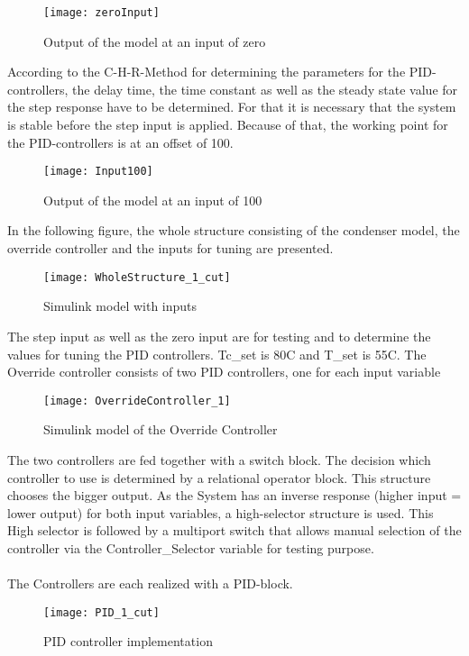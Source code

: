 \begin{figure}[H]
	\centering
	\texttt{[image: zeroInput]}
	\caption{Output of the model at an input of zero}
	\label{fig:zeorInput}
\end{figure}

\newpage



According to the C-H-R-Method for determining the parameters for the PID-controllers, the delay time, the time constant as well as the steady state value for the step response have to be determined.
For that it is necessary that the system is stable before the step input is applied.
Because of that, the working point for the PID-controllers is at an offset of 100.
\begin{figure}[H]
	\centering
	\texttt{[image: Input100]}
	\caption{Output of the model at an input of 100}
	\label{fig:Input100}
\end{figure}

In the following figure, the whole structure consisting of the condenser model, the override controller and the inputs for tuning are presented.

\begin{figure}[H]
	\centering
	\texttt{[image: WholeStructure\_1\_cut]}
	\caption{Simulink model with inputs}
	\label{fig:WholeStructure}
\end{figure}

The step input as well as the zero input are for testing and to determine the values for tuning the PID controllers. Tc\_set is 80\degree C and T\_set is 55\degree C.
The Override controller consists of two PID controllers, one for each input variable

\begin{figure}[H]
	\centering
	\texttt{[image: OverrideController\_1]}
	\caption{Simulink model of the Override Controller}
	\label{fig:OverrideController}
\end{figure}

The two controllers are fed together with a switch block. The decision which controller to use is determined by a relational operator block. This structure chooses the bigger output. As the System has an inverse response (higher input = lower output)  for both input variables, a high-selector structure is used.
This High selector is followed by a multiport switch that allows manual selection of the controller via the Controller\_Selector variable for testing purpose.\\
\\
The Controllers are each realized with a PID-block.
\begin{figure}[H]
	\centering
	\texttt{[image: PID\_1\_cut]}
	\caption{PID controller implementation}
	\label{fig:PID}
\end{figure}

